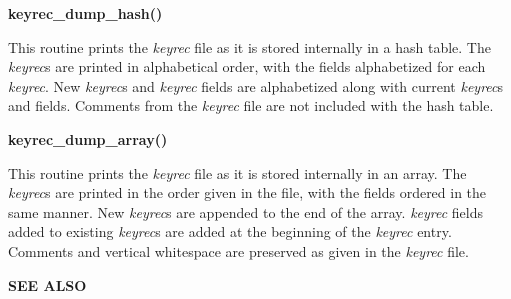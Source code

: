 {\bf keyrec\_dump\_hash()}

This routine prints the {\it keyrec} file as it is stored internally in a
hash table.  The {\it keyrec}s are printed in alphabetical order, with the
fields alphabetized for each {\it keyrec}.  New {\it keyrec}s and {\it keyrec}
fields are alphabetized along with current {\it keyrec}s and fields.  Comments
from the {\it keyrec} file are not included with the hash table.

{\bf keyrec\_dump\_array()}

This routine prints the {\it keyrec} file as it is stored internally in
an array.  The {\it keyrec}s are printed in the order given in the file,
with the fields ordered in the same manner.  New {\it keyrec}s are
appended to the end of the array.  {\it keyrec} fields added to existing
{\it keyrec}s are added at the beginning of the {\it keyrec} entry.
Comments and vertical whitespace are preserved as given in the
{\it keyrec} file.

{\bf SEE ALSO}


